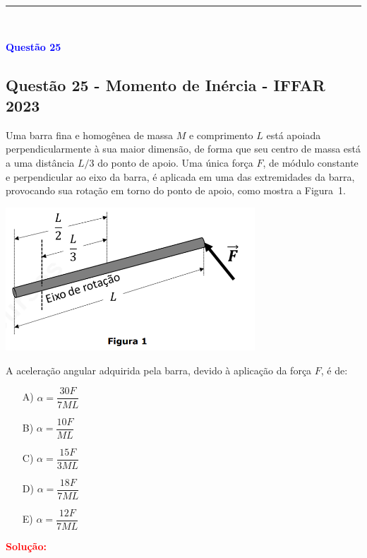 \documentclass[a4paper,12pt]{article}
\begin{document}
\noindent\rule{\linewidth}{0.6pt}\\


\begin{flushleft}
\textbf{\textcolor{blue}{\Large Quest\~ao 25 }}\\
\noindent
\subsection{Quest\~ao 25 - Momento de In\'ercia - IFFAR 2023}
Uma barra fina e homogênea de massa $M$ e comprimento $L$ está apoiada perpendicularmente
à sua maior dimensão, de forma que seu centro de massa está a uma distância $L/3$ do 
ponto de apoio. Uma única força $F$, de módulo constante e perpendicular ao eixo da 
barra, é aplicada em uma das extremidades da barra, provocando sua rotação em torno 
do ponto de apoio, como mostra a Figura~1.

\begin{center}
\includegraphics[width=0.7\textwidth]{figures/barra_momento_de_inercia.png} \\[0.3cm]
\end{center}

A aceleração angular adquirida pela barra, devido à aplicação da força $F$, é de:

\begin{itemize}
\item[A)] $\alpha = \dfrac{30F}{7ML}$
\item[B)] $\alpha = \dfrac{10F}{ML}$
\item[C)] $\alpha = \dfrac{15F}{3ML}$
\item[D)] $\alpha = \dfrac{18F}{7ML}$
\item[E)] $\alpha = \dfrac{12F}{7ML}$
\end{itemize}

\vspace{0.5cm}

\textcolor{red}{\textbf{Solução:}}\\


\end{flushleft}
\end{document}
